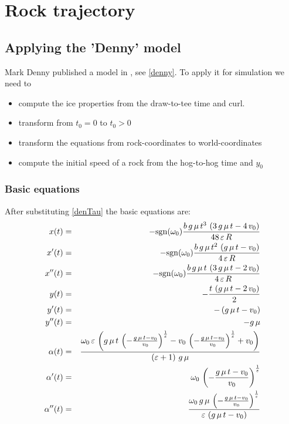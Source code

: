 \chapter{Rock trajectory}
\section{Applying the 'Denny' model}

Mark Denny published a model in \cite{denny:98}, see \ref{denny}. To apply it
for simulation we need to
\begin{itemize}
\item compute the ice properties from the draw-to-tee time and curl.
\item transform from $t_0 = 0$ to $t_0 > 0$
\item transform the equations from rock-coordinates to world-coordinates
\item compute the initial speed of a rock from the hog-to-hog time and $y_0$
\end{itemize}

\subsection{Basic equations}
After substituting \eqref{denTau} the basic equations are:
\begin{eqnarray}
\eqlab{dennyX}
x(t) &=& -\sgn(\omega_0){{b\,g\,\mu\,t^3\,\left(3\,g\,\mu\,t-4\,v_{0}\right)}\over{48\,
 \varepsilon\,R}} \\
x'(t) &=& -\sgn(\omega_0){{b\,g\,\mu\,t^2\,\left(g\,\mu\,t-v_{0}\right)}\over{4\,\varepsilon
 \,R}} \\
x''(t) &=& -\sgn(\omega_0){{b\,g\,\mu\,t\,\left(3\,g\,\mu\,t-2\,v_{0}\right)}\over{4\,
 \varepsilon\,R}} \\
\eqlab{dennyY}
y(t) &=& -{{t\,\left(g\,\mu\,t-2\,v_{0}\right)}\over{2}} \\
\eqlab{dennyYdt}
y'(t) &=& -\left(g\,\mu\,t-v_{0}\right) \\
y''(t) &=& -g\,\mu \\
\alpha (t) &=& {{\omega_{0}\,\varepsilon\,\left(g\,\mu\,t\,\left(-{{g\,\mu\,t-v_{0
 }}\over{v_{0}}}\right)^{{{1}\over{\varepsilon}}}-v_{0}\,\left(-{{g\,
 \mu\,t-v_{0}}\over{v_{0}}}\right)^{{{1}\over{\varepsilon}}}+v_{0}
 \right)}\over{\left(\varepsilon+1\right)\,g\,\mu}} \\
\alpha '(t) &=& \omega_{0}\,\left(-{{g\,\mu\,t-v_{0}}\over{v_{0}}}\right)^{{{1
 }\over{\varepsilon}}} \\
\alpha ''(t) &=& {{\omega_{0}\,g\,\mu\,\left(-{{g\,\mu\,t-v_{0}}\over{v_{0}}}\right)
 ^{{{1}\over{\varepsilon}}}}\over{\varepsilon\,\left(g\,\mu\,t-v_{0}
 \right)}}
\end{eqnarray}

